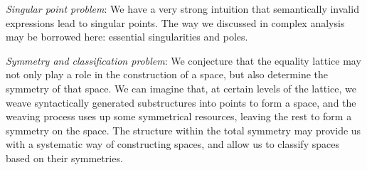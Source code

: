 \emph{Singular point problem}: We have a very strong intuition that semantically invalid expressions lead to singular points.
The way we discussed in complex analysis may be borrowed here: essential singularities and poles.

\emph{Symmetry and classification problem}: We conjecture that the equality lattice may not only play a role in the construction of a space, but also determine the symmetry of that space.
We can imagine that, at certain levels of the lattice, we weave syntactically generated substructures into points to form a space,
and the weaving process uses up some symmetrical resources, leaving the rest to form a symmetry on the space.
The structure within the total symmetry may provide us with a systematic way of constructing spaces, and allow us to classify spaces based on their symmetries.
